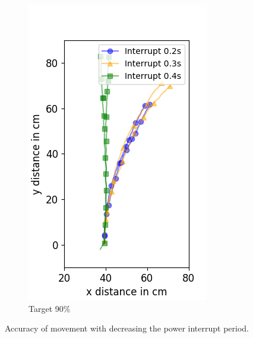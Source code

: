 \begin{figure}
\begin{subfigure}[b]{0.32\textwidth}
		\includegraphics[width=\textwidth]{pics/figure_90.png}
		\caption{Target 90\%}
		\label{fig:target_90}
	\end{subfigure}
	\caption{Accuracy of movement with decreasing the power interrupt period.}
	\label{fig:decreasing_power_period}
\end{figure}

